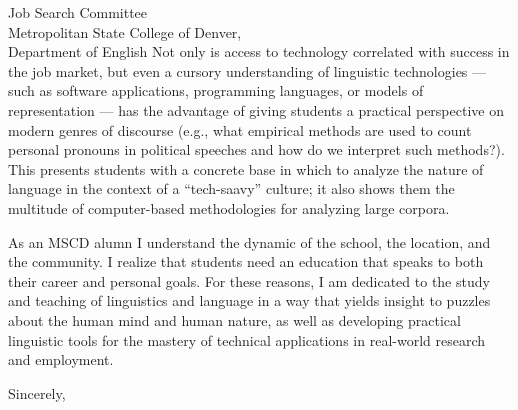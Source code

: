 \documentclass{letter} %
\begin{document}
\begin{letter}{Job Search Committee \\
Metropolitan State College of Denver, \\
Department of English}
\noindent Not only is access to technology correlated with success in the job market, but even a cursory understanding of linguistic technologies --- such as software applications, programming languages, or models of representation --- has the advantage of giving students a practical perspective on modern genres of discourse (e.g., what empirical methods are used to count personal pronouns in political speeches and how do we interpret such methods?). This presents students with a concrete base in which to analyze the nature of language in the context of a ``tech-saavy'' culture; it also shows them the multitude of computer-based methodologies for analyzing large corpora.


\noindent As an MSCD alumn I understand the dynamic of the school, the location, and the community. I  realize that students need an education that speaks to both their career and personal goals. For these reasons, I am dedicated to the study and teaching of linguistics and language in a way that yields insight to puzzles about the human mind and human nature, as well as developing practical linguistic tools for the mastery of technical applications in real-world research and employment.  

\closing{Sincerely,} 
 
\end{letter}
 
\end{document}
